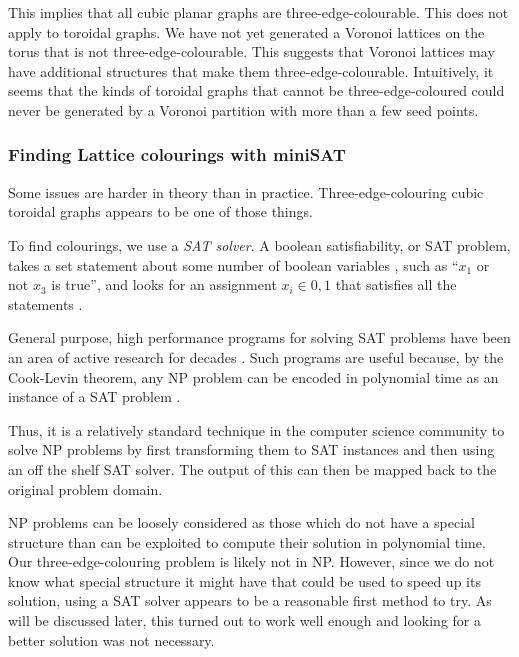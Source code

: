 This implies that all cubic planar graphs are three-edge-colourable. This does not apply to toroidal graphs. We have not yet generated a Voronoi lattices on the torus that is not three-edge-colourable. This suggests that Voronoi lattices may have additional structures that make them three-edge-colourable. Intuitively, it seems that the kinds of toroidal graphs that cannot be three-edge-coloured could never be generated by a Voronoi partition with more than a few seed points.

\hypertarget{finding-lattice-colourings-with-minisat}{%
\subsubsection{Finding Lattice colourings with miniSAT}\label{finding-lattice-colourings-with-minisat}}

Some issues are harder in theory than in practice. Three-edge-colouring cubic toroidal graphs appears to be one of those things.

To find colourings, we use a \emph{SAT solver}. A boolean satisfiability, or SAT problem, takes a set statement about some number of boolean variables , such as ``\(x_1\) or not \(x_3\) is true'', and looks for an assignment \(x_i \in {0,1}\) that satisfies all the statements \autocite{Karp1972}.

General purpose, high performance programs for solving SAT problems have been an area of active research for decades \autocite{alounehComprehensiveStudyAnalysis2019}. Such programs are useful because, by the Cook-Levin theorem, any NP problem can be encoded in polynomial time as an instance of a SAT problem \autocite{cookComplexityTheoremprovingProcedures1971,levin1973universal}.

Thus, it is a relatively standard technique in the computer science community to solve NP problems by first transforming them to SAT instances and then using an off the shelf SAT solver. The output of this can then be mapped back to the original problem domain.

NP problems can be loosely considered as those which do not have a special structure than can be exploited to compute their solution in polynomial time. Our three-edge-colouring problem is likely not in NP. However, since we do not know what special structure it might have that could be used to speed up its solution, using a SAT solver appears to be a reasonable first method to try. As will be discussed later, this turned out to work well enough and looking for a better solution was not necessary.

